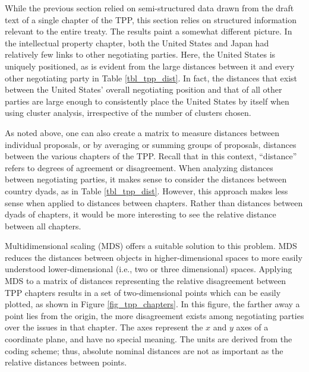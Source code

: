 \documentclass[12pt]{article}
\begin{document}
While the previous section relied on semi-structured data 
drawn from the draft text of a single chapter of the TPP, this section relies on structured information 
relevant to the entire treaty. The results paint a somewhat different picture. In the intellectual 
property chapter, both the United States and Japan had relatively few links to other negotiating 
parties. Here, the United States is uniquely positioned, as is evident from the large distances 
between it and every other negotiating party in Table \ref{tbl_tpp_dist}. 
In fact, the distances that exist between the United States' overall negotiating position 
and that of all other parties are large enough to consistently place the United States by itself when 
using cluster analysis, irrespective of the number of clusters chosen.

As noted above, one can also create a matrix to measure distances between 
individual proposals, or by averaging or summing groups of proposals, distances 
between the various chapters of the TPP. Recall that in this context, ``distance'' refers to 
degrees of agreement or disagreement. When analyzing distances between negotiating parties, 
it makes sense to consider the distances between country dyads, as in Table \ref{tbl_tpp_dist}. 
However, this approach makes less sense when applied to distances 
between chapters. Rather than distances between dyads of chapters, it would be more interesting to see 
the relative distance between all chapters.

Multidimensional scaling (MDS) offers a suitable solution to this problem. MDS reduces the distances 
between objects in higher-dimensional spaces to more easily understood lower-dimensional (i.e., two or three dimensional) 
spaces. Applying MDS to a matrix of distances representing the relative disagreement between TPP chapters results in a set of 
two-dimensional 
points which can be easily plotted, as shown in Figure \ref{fig_tpp_chapters}. 
In this figure, the farther away a point lies from the origin, the more disagreement 
exists among negotiating parties over the issues in that chapter.
The axes represent the $x$ and $y$ axes of a 
coordinate plane, and have no special meaning. The units are derived from the coding scheme; thus, 
absolute nominal distances are not as important as the relative distances between points.
\end{document}
